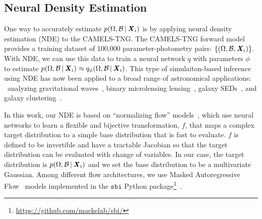 \subsection{Neural Density Estimation} \label{sec:anpe}
One way to accurately estimate $p(\Omega, \mathcal{B}\,|\, {\textbf{\textit{X}}_i})$ is
by applying neural density estimation (NDE) to the CAMELS-TNG.
The CAMELS-TNG forward model provides a training dataset of 100,000
parameter-photometry pairs: $\{(\Omega, \mathcal{B}, {\textbf{\textit{X}}_i})\}$.
With NDE, we can use this data to train a neural network $q$ with parameters
$\phi$ to estimate 
$p(\Omega, \mathcal{B}\,|\, {\textbf{\textit{X}}_i}) \approx
q_\phi(\Omega, \mathcal{B}\,|\, {\textbf{\textit{X}}_i})$.
This type of simulaiton-based inference using NDE has now been applied to a
broad range of astronomical applications:
\eg~analyzing gravitational waves~\citep{wong2020, dax2021}, binary
microlensing lensing~\citep{zhang2021}, galaxy SEDs~\cite{hahn2022a}, and
galaxy clustering~\cite{hahn2022d, hahn2023}. 

In this work, our NDE is based on ``normalizing flow'' models~\citep{tabak2010,
tabak2013}, which use neural networks to learn a flexible and bijective
transformation, $f$, that maps a complex target distribution to a simple base
distribution that is fast to evaluate.
$f$ is defined to be invertible and have a tractable Jacobian so that the 
target distribution can be evaluated with change of variables. 
In our case, the target distribution is 
$p(\Omega, \mathcal{B}\,|\, {\textbf{\textit{X}}_i})$ and we set the base distribution to
be a multivariate Gaussian. 
Among different flow architectures, we use Masked Autoregressive
Flow~\citep[MAF;][]{papamakarios2017} models implemented in the $\mathtt{sbi}$
Python
package\footnote{\url{https://github.com/mackelab/sbi/}}~\citep{greenberg2019,
tejero-cantero2020}.


